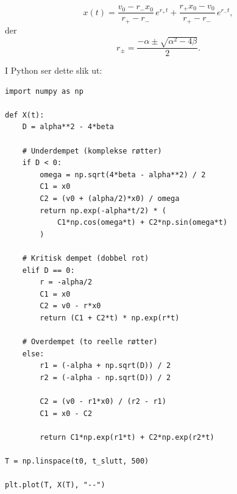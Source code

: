 \documentclass[a4paper,12pt]{article}
\begin{document}
\begin{equation}
x(t)=
\frac{v_0-r_- x_0}{r_+ - r_-}\,e^{r_+ t}
+
\frac{r_+ x_0-v_0}{r_+ - r_-}\,e^{r_- t},
\end{equation}
der
\[
r_{\pm}=\frac{-\alpha \pm \sqrt{\alpha^2-4\beta}}{2}.
\]

I Python ser dette slik ut:
\begin{lstlisting}
import numpy as np

def X(t):
    D = alpha**2 - 4*beta

    # Underdempet (komplekse røtter)
    if D < 0:
        omega = np.sqrt(4*beta - alpha**2) / 2
        C1 = x0
        C2 = (v0 + (alpha/2)*x0) / omega
        return np.exp(-alpha*t/2) * (
            C1*np.cos(omega*t) + C2*np.sin(omega*t)
        )

    # Kritisk dempet (dobbel rot)
    elif D == 0:
        r = -alpha/2
        C1 = x0
        C2 = v0 - r*x0
        return (C1 + C2*t) * np.exp(r*t)

    # Overdempet (to reelle røtter)
    else:
        r1 = (-alpha + np.sqrt(D)) / 2
        r2 = (-alpha - np.sqrt(D)) / 2
        
        C2 = (v0 - r1*x0) / (r2 - r1)
        C1 = x0 - C2
        
        return C1*np.exp(r1*t) + C2*np.exp(r2*t)

T = np.linspace(t0, t_slutt, 500)

plt.plot(T, X(T), "--")
\end{lstlisting}
\end{document}
